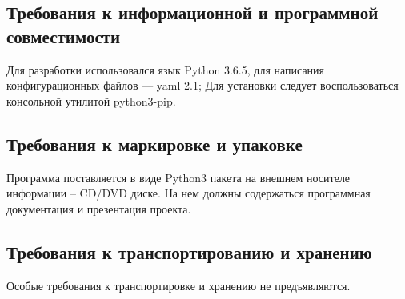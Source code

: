 \subsection{Требования к информационной и программной совместимости}
Для разработки использовался язык Python 3.6.5, для написания конфигурационных
файлов --- yaml 2.1; Для установки следует воспользоваться консольной утилитой
python3-pip.

\subsection{Требования к маркировке и упаковке}
Программа поставляется в виде Python3 пакета на внешнем носителе
информации – CD/DVD диске. На нем должны содержаться программная
документация и презентация проекта.

\subsection{Требования к транспортированию и хранению}
Особые требования к транспортировке и хранению не предъявляются.


